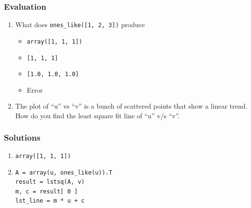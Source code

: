 \documentclass[17pt]{beamer}
\begin{document}
\begin{frame}
\frametitle{Evaluation}
\label{sec-6}


\begin{enumerate}
\item What does \texttt{ones\_{like}([1, 2, 3])} produce \pause
\begin{itemize}
\item \texttt{array([1, 1, 1])}
\item \texttt{[1, 1, 1]}
\item \texttt{[1.0, 1.0, 1.0]}
\item Error\pause
\end{itemize}
\vspace{10pt}
\item The plot of ``u'' vs ``v'' is a bunch of scattered points that show a
     linear trend. How do you find the least square fit line of ``u'' v/s ``v''.
\end{enumerate}
\end{frame}
\begin{frame}
\frametitle{Solutions}
\label{sec-7}


\begin{enumerate}
\item \texttt{array([1, 1, 1])}\pause
\vspace{15pt}
\item \texttt{A = array(u, ones\_like(u)).T}\\
     \texttt{result = lstsq(A, v)}\\
     \texttt{m, c = result[ 0 ]}\\
     \texttt{lst\_line = m * u + c}
\end{enumerate}
\end{frame}
\end{document}
